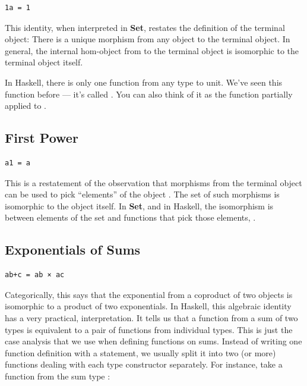 \begin{verbatim}
1a = 1
\end{verbatim}

This identity, when interpreted in \textbf{Set}, restates the definition
of the terminal object: There is a unique morphism from any object to
the terminal object. In general, the internal hom-object from 
to the terminal object is isomorphic to the terminal object itself.

In Haskell, there is only one function from any type  to unit.
We've seen this function before --- it's called . You can
also think of it as the function  partially applied to
\code{()}.

\subsection{First Power}\label{first-power}

\begin{verbatim}
a1 = a
\end{verbatim}

This is a restatement of the observation that morphisms from the
terminal object can be used to pick ``elements'' of the object
. The set of such morphisms is isomorphic to the object
itself. In \textbf{Set}, and in Haskell, the isomorphism is between
elements of the set  and functions that pick those elements,
.

\subsection{Exponentials of Sums}\label{exponentials-of-sums}

\begin{verbatim}
ab+c = ab × ac
\end{verbatim}

Categorically, this says that the exponential from a coproduct of two
objects is isomorphic to a product of two exponentials. In Haskell, this
algebraic identity has a very practical, interpretation. It tells us
that a function from a sum of two types is equivalent to a pair of
functions from individual types. This is just the case analysis that we
use when defining functions on sums. Instead of writing one function
definition with a  statement, we usually split it into two
(or more) functions dealing with each type constructor separately. For
instance, take a function from the sum type
:


